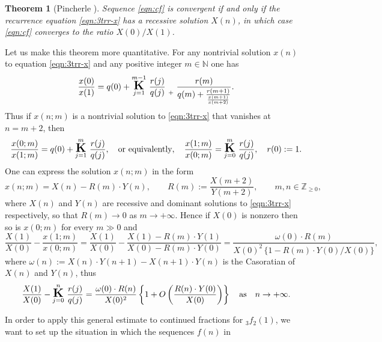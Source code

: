 \documentclass[a4paper,12pt]{article}
\theoremstyle{plain}
\newtheorem{theorem}{Theorem}[section]
\def\N{\mathbb{N}}
\def\Z{\mathbb{Z}}
\def\cfL{\mbox{\Large \boldmath $\mathrm{K}$}}
\begin{document}
\begin{theorem}[Pincherle \cite{Pincherle}] \label{thm:pincherle}
Sequence \eqref{eqn:cf} is convergent if and only if the recurrence 
equation \eqref{eqn:3trr-x} has a recessive solution $X(n)$, in which case 
\eqref{eqn:cf} converges to the ratio $X(0)/X(1)$.  
\end{theorem} 
\par
Let us make this theorem more quantitative. 
For any nontrivial solution $x(n)$ to equation \eqref{eqn:3trr-x} and any 
positive integer $m \in \N$ one has  
\[
\frac{x(0)}{x(1)} = q(0) + 
\overset{m-1}{\underset{j=1}{\cfL}} \,\, \frac{r(j)}{q(j)} 
\, \mathop{}_{+} \, \dfrac{r(m)}{q(m) + \frac{r(m+1)}{ \frac{x(m+1)}{x(m+2)}}}. 
\]
Thus if $x(n; m)$ is a nontrivial solution to \eqref{eqn:3trr-x} that vanishes at $n = m+2$, 
then 
\[
\frac{x(0; m)}{x(1; m)} = q(0) + \overset{m}{\underset{j=1}{\cfL}} \,\, \frac{r(j)}{q(j)}, 
\quad \mbox{or equivalently}, \quad 
\frac{x(1; m)}{x(0; m)} = \overset{m}{\underset{j=0}{\cfL}} \,\, \frac{r(j)}{q(j)}, 
\quad r(0) := 1. 
\] 
One can express the solution $x(n;m)$ in the form   
\[
x(n; m) = X(n) - R(m) \cdot Y(n), \qquad 
R(m) := \frac{X(m+2)}{Y(m+2)}, \qquad m, n \in \Z_{\ge 0},
\] 
where $X(n)$ and $Y(n)$ are recessive and dominant 
solutions to \eqref{eqn:3trr-x} respectively, so that $R(m) \to 0$ as 
$m \to +\infty$.  
Hence if $X(0)$ is nonzero then so is $x(0; m)$ for every $m \gg 0$ and  
\[
\frac{X(1)}{X(0)} - \frac{x(1; m)}{x(0; m)} = 
\frac{X(1)}{X(0)} - \frac{X(1) - R(m) \cdot Y(1)}{X(0) - R(m) \cdot Y(0)}
= \frac{\omega(0) \cdot R(m) }{X(0)^2 \, \{1 - R(m) \cdot Y(0)/X(0) \} },  
\]
where $\omega(n) := X(n) \cdot Y(n+1) - X(n+1) \cdot Y(n)$ is the Casoratian 
of $X(n)$ and $Y(n)$, thus 
\begin{equation} \label{eqn:error} 
\frac{X(1)}{X(0)} -  \overset{n}{\underset{j=0}{\cfL}} \,\, \frac{r(j)}{q(j)} 
= \frac{\omega(0) \cdot R(n) }{X(0)^2} 
\left\{1+ O\left (\frac{R(n) \cdot Y(0)}{X(0)} \right) \right\} \quad 
\mbox{as} \quad n \to + \infty. 
\end{equation}
\par
In order to apply this general estimate to continued fractions for ${}_3f_2(1)$, 
we want to set up the situation in which the sequences $f(n)$ in 
\end{document}
